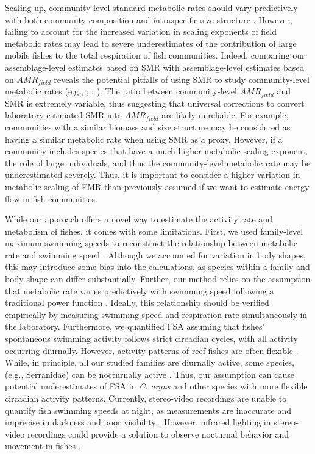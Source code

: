 \documentclass[
]{article}
\begin{document}
Scaling up, community-level standard metabolic rates should vary
predictively with both community composition and intraspecific size
structure \citep{Barneche2014, Allen2005}. However, failing to account
for the increased variation in scaling exponents of field metabolic
rates may lead to severe underestimates of the contribution of large
mobile fishes to the total respiration of fish communities. Indeed,
comparing our assemblage-level estimates based on SMR with
assemblage-level estimates based on \(AMR_{field}\) reveals the
potential pitfalls of using SMR to study community-level metabolic rates
(e.g., \citet{Cheung2013}; \citet{Deutsch2015}; \citet{Holt2015}). The
ratio between community-level \(AMR_{field}\) and SMR is extremely
variable, thus suggesting that universal corrections to convert
laboratory-estimated SMR into \(AMR_{field}\) are likely unreliable. For
example, communities with a similar biomass and size structure may be
considered as having a similar metabolic rate when using SMR as a proxy.
However, if a community includes species that have a much higher
metabolic scaling exponent, the role of large individuals, and thus the
community-level metabolic rate may be underestimated severely. Thus, it
is important to consider a higher variation in metabolic scaling of FMR
than previously assumed if we want to estimate energy flow in fish
communities.

While our approach offers a novel way to estimate the activity rate and
metabolism of fishes, it comes with some limitations. First, we used
family-level maximum swimming speeds to reconstruct the relationship
between metabolic rate and swimming speed \citep{Fulton2007}. Although
we accounted for variation in body shapes, this may introduce some bias
into the calculations, as species within a family and body shape can
differ substantially. Further, our method relies on the assumption that
metabolic rate varies predictively with swimming speed following a
traditional power function \citep{Brett1964, Korsmeyer2002}. Ideally,
this relationship should be verified empirically by measuring swimming
speed and respiration rate simultaneously in the laboratory.
Furthermore, we quantified FSA assuming that fishes' spontaneous
swimming activity follows strict circadian cycles, with all activity
occurring diurnally. However, activity patterns of reef fishes are often
flexible \citep{Zhdanova2006}. While, in principle, all our studied
families are diurnally active, some species, (e.g., Serranidae) can be
nocturnally active \citep{Mourier2016}. Thus, our assumption can cause
potential underestimates of FSA in \emph{C. argus} and other species
with more flexible circadian activity patterns. Currently, stereo-video
recordings are unable to quantify fish swimming speeds at night, as
measurements are inaccurate and imprecise in darkness and poor
visibility \citep{Neuswanger2016}. However, infrared lighting in
stereo-video recordings could provide a solution to observe nocturnal
behavior and movement in fishes \citep{Bassett2011}.
\end{document}
